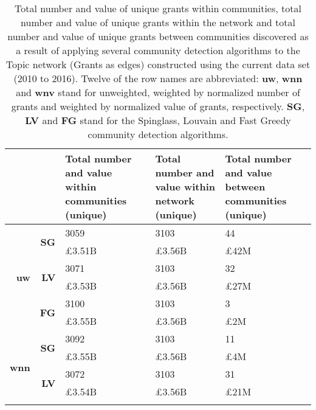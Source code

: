 \begin{table}[!htbp]
\centering
\caption[Total number and value of unique grants within communities, total number and value of unique grants within the network and total number and value of unique grants between communities discovered in the Topic network (Grants as edges) constructed using the current data set (2010 to 2016)]{Total number and value of unique grants within communities, total number and value of unique grants within the network and total number and value of unique grants between communities discovered as a result of applying several community detection algorithms to the Topic network (Grants as edges) constructed using the current data set (2010 to 2016). Twelve of the row names are abbreviated: \textbf{uw}, \textbf{wnn} and \textbf{wnv} stand for unweighted, weighted by normalized number of grants and weighted by normalized value of grants, respectively. \textbf{SG}, \textbf{LV} and \textbf{FG} stand for the Spinglass, Louvain and Fast Greedy community detection algorithms.}
\label{table:topic_a_current_grants2_appendix}
\begin{tabular}{r|r|>{\raggedleft\arraybackslash}p{3.5cm}|>{\raggedleft\arraybackslash}p{3.2cm}|>{\raggedleft\arraybackslash}p{3.5cm}}
\multicolumn{2}{c|}{} & \textbf{Total number and value within communities (unique)} & \textbf{Total number and value within network (unique)} & \textbf{Total number and value between communities (unique)}\\
\hline
\multirow{6}{*}{\textbf{uw}}
& \multirow{2}{*}{\textbf{SG}}
& {3059} & {3103} & {44}\\
& {} & {\pounds3.51B} & {\pounds3.56B} & {\pounds42M}\\
\cline{2-5}
& \multirow{2}{*}{\textbf{LV}}
& {3071} & {3103} & {32}\\
& {} & {\pounds3.53B} & {\pounds3.56B} & {\pounds27M}\\
\cline{2-5}
& \multirow{2}{*}{\textbf{FG}}
& {3100} & {3103} & {3}\\
& {} & {\pounds3.55B} & {\pounds3.56B} & {\pounds2M}\\
\hline
\multirow{6}{*}{\textbf{wnn}}
& \multirow{2}{*}{\textbf{SG}}
& {3092} & {3103} & {11}\\
& {} & {\pounds3.55B} & {\pounds3.56B} & {\pounds4M}\\
\cline{2-5}
& \multirow{2}{*}{\textbf{LV}}
& {3072} & {3103} & {31}\\
& {} & {\pounds3.54B} & {\pounds3.56B} & {\pounds21M}\\
\cline{2-5}

\end{tabular}
\end{table}
